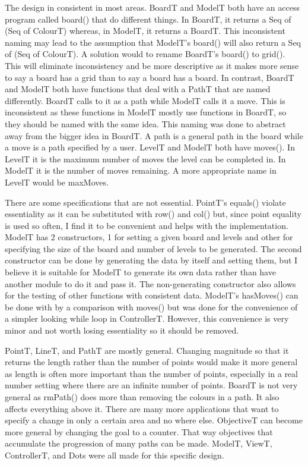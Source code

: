 \documentclass[12pt]{article}
\begin{document}
The design in consistent in most areas. BoardT and ModelT both have an access program called board() that do different things. In BoardT, it returns a Seq of (Seq of ColourT) whereas, in ModelT, it returns a BoardT. This inconsistent naming may lead to the assumption that ModelT's board() will also return a Seq of (Seq of ColourT). A solution would to rename BoardT's board() to grid(). This will eliminate inconsistency and be more descriptive as it makes more sense to say a board has a grid than to say a board has a board. In contrast, BoardT and ModelT both have functions that deal with a PathT that are named differently. BoardT calls to it as a path while ModelT calls it a move. This is inconsistent as these functions in ModelT mostly use functions in BoardT, so they should be named with the same idea. This naming was done to abstract away from the bigger idea in BoardT. A path is a general path in the board while a move is a path specified by a user. LevelT and ModelT both have moves(). In LevelT it is the maximum number of moves the level can be completed in. In ModelT it is the number of moves remaining. A more appropriate name in LevelT would be maxMoves.

There are some specifications that are not essential. PointT's equals() violate essentiality as it can be substituted with row() and col() but, since point equality is used so often, I find it to be convenient and helps with the implementation. ModelT has 2 constructors, 1 for setting a given board and levels and other for specifying the size of the board and number of levels to be generated. The second constructor can be done by generating the data by itself and setting them, but I believe it is suitable for ModelT to generate its own data rather than have another module to do it and pass it. The non-generating constructor also allows for the testing of other functions with consistent data. ModelT's hasMoves() can be done with by a comparison with moves() but was done for the convenience of a simpler looking while loop in ControllerT. However, this convenience is very minor and not worth losing essentiality so it should be removed.

PointT, LineT, and PathT are mostly general. Changing magnitude so that it returns the length rather than the number of points would make it more general as length is often more important than the number of points, especially in a real number setting where there are an infinite number of points. BoardT is not very general as rmPath() does more than removing the colours in a path. It also affects everything above it. There are many more applications that want to specify a change in only a certain area and no where else. ObjectiveT can become more general by changing the goal to a counter. That way objectives that accumulate the progression of many paths can be made. ModelT, ViewT, ControllerT, and Dots were all made for this specific design. 
\end{document}
